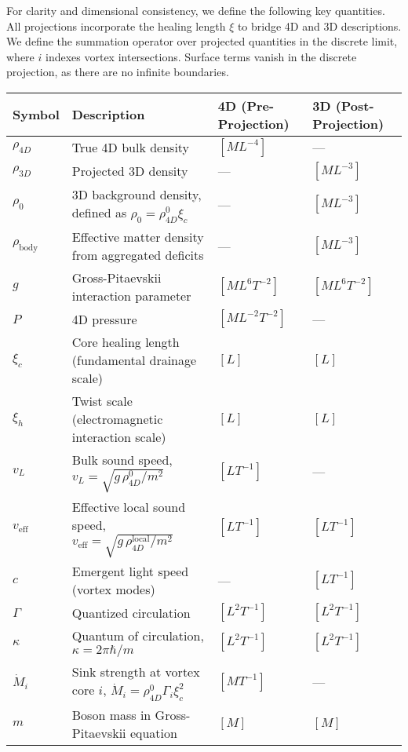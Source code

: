 For clarity and dimensional consistency, we define the following key quantities. All projections incorporate the healing length $\xi$ to bridge 4D and 3D descriptions. We define the summation operator over projected quantities in the discrete limit, where $i$ indexes vortex intersections. Surface terms vanish in the discrete projection, as there are no infinite boundaries.

\begin{table}[H]
\centering
\begingroup
\small
\begin{tabularx}{\textwidth}{|l|Y|l|l|}
\hline
Symbol & Description & 4D (Pre-Projection) & 3D (Post-Projection) \\
\hline
$\rho_{4D}$ & True 4D bulk density & $[M L^{-4}]$ & --- \\
\hline
$\rho_{3D}$ & Projected 3D density & --- & $[M L^{-3}]$ \\
\hline
$\rho_0$ & 3D background density, defined as $\rho_0 = \rho_{4D}^0 \xi_c$ & --- & $[M L^{-3}]$ \\
\hline
$\rho_{\text{body}}$ & Effective matter density from aggregated deficits & --- & $[M L^{-3}]$ \\
\hline
$g$ & Gross-Pitaevskii interaction parameter & $[M L^6 T^{-2}]$ & $[M L^6 T^{-2}]$ \\
\hline
$P$ & 4D pressure & $[M L^{-2} T^{-2}]$ & --- \\
\hline
$\xi_c$ & Core healing length (fundamental drainage scale) & $[L]$ & $[L]$ \\
\hline
$\xi_h$ & Twist scale (electromagnetic interaction scale) & $[L]$ & $[L]$ \\
\hline
$v_L$ & Bulk sound speed, $v_L = \sqrt{g \, \rho_{4D}^0 / m^{2}}$ & $[L T^{-1}]$ & --- \\
\hline
$v_{\text{eff}}$ & Effective local sound speed, $v_{\text{eff}} = \sqrt{g \, \rho_{4D}^{\text{local}} / m^{2}}$ & $[L T^{-1}]$ & $[L T^{-1}]$ \\
\hline
$c$ & Emergent light speed (vortex modes) & --- & $[L T^{-1}]$ \\
\hline
$\Gamma$ & Quantized circulation & $[L^2 T^{-1}]$ & $[L^2 T^{-1}]$ \\
\hline
$\kappa$ & Quantum of circulation, $\kappa = 2 \pi \hbar / m$ & $[L^2 T^{-1}]$ & $[L^2 T^{-1}]$ \\
\hline
$\dot{M}_i$ & Sink strength at vortex core $i$, $\dot{M}_i = \rho_{4D}^0 \Gamma_i \xi_c^2$ & $[M T^{-1}]$ & --- \\
\hline
$m$ & Boson mass in Gross-Pitaevskii equation & $[M]$ & $[M]$ \\

\end{tabularx}
\end{table}
